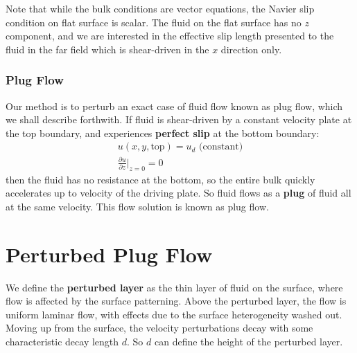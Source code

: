 \documentclass[12pt, a4paper, twoside, openright]{book}
\begin{document}
Note that while the bulk conditions are vector equations, the Navier slip condition on  flat surface is scalar.  The fluid on the flat surface has no $z$ component, and we are interested in the effective slip length presented to the fluid in the far field which is shear-driven in the $x$ direction only. 


\subsubsection*{Plug Flow}

Our method is to perturb an exact case of fluid flow known as plug flow, which we shall describe forthwith.  If fluid is shear-driven by a constant velocity plate at the top boundary, and experiences \textbf{perfect slip} at the bottom boundary:
\begin{gather}
u(x,y,\mathrm{top}) = u_d \text{  (constant)} \\
\frac{\partial u}{\partial z} \rvert_{z=0} = 0
\end{gather}
then the fluid has no resistance at the bottom, so the entire bulk quickly accelerates up to velocity of the driving plate.  So fluid flows as a \textbf{plug} of fluid all at the same velocity.  This flow solution is known as plug flow.

\begin{center}
\end{center}


\section*{Perturbed Plug Flow}

We define the \textbf{perturbed layer} as the thin layer of fluid on the surface, where flow is affected by the surface patterning.  Above the perturbed layer, the flow is uniform laminar flow, with effects due to the surface heterogeneity washed out.  Moving up from the surface, the velocity perturbations decay with some characteristic decay length $d$.
So $d$ can define the height of the perturbed layer.
\end{document}
